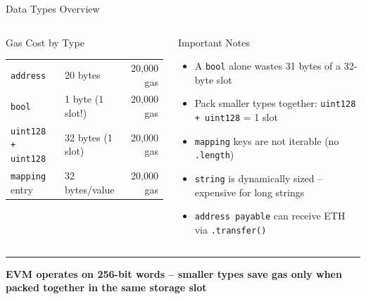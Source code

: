 \documentclass[8pt,aspectratio=169]{beamer}
\newcommand{\bottomnote}[1]{\vfill\vspace{-2mm}\textcolor{mllavender2}{\rule{\textwidth}{0.4pt}}\vspace{1mm}\footnotesize\textbf{#1}}
\begin{document}
\begin{frame}{Data Types Overview}
\begin{columns}
\begin{block}{Gas Cost by Type}
\begin{tabular}{@{}llr@{}}
\texttt{address} & 20 bytes & 20,000 gas \\
\texttt{bool} & 1 byte (1 slot!) & 20,000 gas \\
\texttt{uint128 + uint128} & 32 bytes (1 slot) & 20,000 gas \\
\texttt{mapping} entry & 32 bytes/value & 20,000 gas \\
\bottomrule
\end{tabular}
\end{block}
\begin{block}{Important Notes}
\begin{itemize}\small
  \item A \texttt{bool} alone wastes 31 bytes of a 32-byte slot
  \item Pack smaller types together: \texttt{uint128 + uint128} = 1 slot
  \item \texttt{mapping} keys are not iterable (no \texttt{.length})
  \item \texttt{string} is dynamically sized -- expensive for long strings
  \item \texttt{address payable} can receive ETH via \texttt{.transfer()}
\end{itemize}
\end{block}
\end{columns}
\bottomnote{EVM operates on 256-bit words -- smaller types save gas only when packed together in the same storage slot}
\end{frame}
\end{document}
